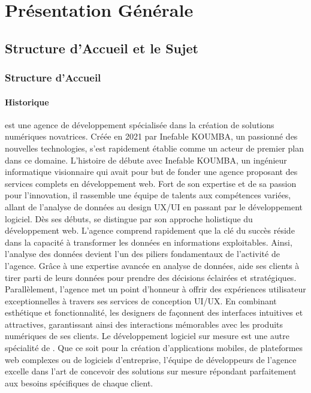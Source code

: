 \part{Présentation Générale}
\label{part:presentation}
\chapter{Structure d’Accueil et le Sujet}
\section{Structure d’Accueil}
\subsection{Historique}

\mazf est une agence de développement spécialisée dans la création de solutions
numériques novatrices. Créée en 2021 par Inefable KOUMBA, un passionné des nouvelles
technologies, \mazf s'est rapidement établie comme un acteur de premier plan dans ce domaine.
L'histoire de \mazf débute avec Inefable KOUMBA, un ingénieur informatique
visionnaire qui avait pour but de fonder une agence proposant des services complets
en développement web. Fort de son expertise et de sa passion pour l’innovation,
il rassemble une équipe de talents aux compétences variées, allant de l’analyse
de données au design UX/UI en passant par le développement logiciel.
Dès ses débuts, \mazf se distingue par son approche holistique du développement
web. L’agence comprend rapidement que la clé du succès réside dans la capacité à
transformer les données en informations exploitables. Ainsi, l’analyse des données
devient l’un des piliers fondamentaux de l’activité de l’agence. Grâce à une
expertise avancée en analyse de données, \mazf aide ses clients à tirer
parti de leurs données pour prendre des décisions éclairées et stratégiques.
Parallèlement, l’agence met un point d’honneur à offrir des expériences utilisateur
exceptionnelles à travers ses services de conception UI/UX. En combinant esthétique
et fonctionnalité, les designers de \mazf façonnent des interfaces intuitives
et attractives, garantissant ainsi des interactions mémorables avec les produits
numériques de ses clients. Le développement logiciel sur mesure est une autre
spécialité de \mazf. Que ce soit pour la création d’applications mobiles,
de plateformes web complexes ou de logiciels d’entreprise, l’équipe de développeurs
de l’agence excelle dans l’art de concevoir des solutions sur mesure répondant
parfaitement aux besoins spécifiques de chaque client.

